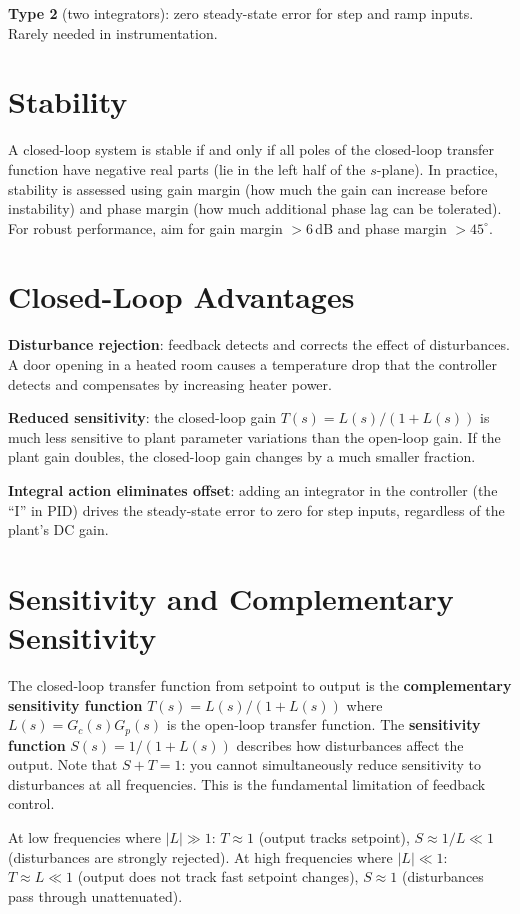 \documentclass[11pt,letterpaper,twoside,openany]{book}
\begin{document}
\textbf{Type 2} (two integrators): zero steady-state error for step and ramp inputs. Rarely needed in instrumentation.

\section{Stability}
A closed-loop system is stable if and only if all poles of the closed-loop transfer function have negative real parts (lie in the left half of the $s$-plane). In practice, stability is assessed using gain margin (how much the gain can increase before instability) and phase margin (how much additional phase lag can be tolerated). For robust performance, aim for gain margin $> 6$\,dB and phase margin $> 45^\circ$.

\section{Closed-Loop Advantages}
\textbf{Disturbance rejection}: feedback detects and corrects the effect of disturbances. A door opening in a heated room causes a temperature drop that the controller detects and compensates by increasing heater power.

\textbf{Reduced sensitivity}: the closed-loop gain $T(s) = L(s)/(1+L(s))$ is much less sensitive to plant parameter variations than the open-loop gain. If the plant gain doubles, the closed-loop gain changes by a much smaller fraction.

\textbf{Integral action eliminates offset}: adding an integrator in the controller (the ``I'' in PID) drives the steady-state error to zero for step inputs, regardless of the plant's DC gain.


\section{Sensitivity and Complementary Sensitivity}
The closed-loop transfer function from setpoint to output is the \textbf{complementary sensitivity function} $T(s) = L(s)/(1+L(s))$ where $L(s) = G_c(s)G_p(s)$ is the open-loop transfer function. The \textbf{sensitivity function} $S(s) = 1/(1+L(s))$ describes how disturbances affect the output. Note that $S + T = 1$: you cannot simultaneously reduce sensitivity to disturbances at all frequencies. This is the fundamental limitation of feedback control.

At low frequencies where $|L| \gg 1$: $T \approx 1$ (output tracks setpoint), $S \approx 1/L \ll 1$ (disturbances are strongly rejected). At high frequencies where $|L| \ll 1$: $T \approx L \ll 1$ (output does not track fast setpoint changes), $S \approx 1$ (disturbances pass through unattenuated).
\end{document}
